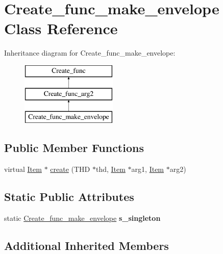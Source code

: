 \hypertarget{classCreate__func__make__envelope}{}\section{Create\+\_\+func\+\_\+make\+\_\+envelope Class Reference}
\label{classCreate__func__make__envelope}
Inheritance diagram for Create\+\_\+func\+\_\+make\+\_\+envelope\+:\begin{figure}[H]
\begin{center}
\leavevmode
\includegraphics[height=3.000000cm]{classCreate__func__make__envelope}
\end{center}
\end{figure}
\subsection*{Public Member Functions}
\begin{DoxyCompactItemize}
\item 
virtual \mbox{\hyperlink{classItem}{Item}} $\ast$ \mbox{\hyperlink{classCreate__func__make__envelope_a4936fb2e01757c1c96fcfd5d22f11d9a}{create}} (T\+HD $\ast$thd, \mbox{\hyperlink{classItem}{Item}} $\ast$arg1, \mbox{\hyperlink{classItem}{Item}} $\ast$arg2)
\end{DoxyCompactItemize}
\subsection*{Static Public Attributes}
\begin{DoxyCompactItemize}
\item 
\mbox{\label{classCreate__func__make__envelope_abe193555a644b4465a97a4c6076a1cba}} 
static \mbox{\hyperlink{classCreate__func__make__envelope}{Create\+\_\+func\+\_\+make\+\_\+envelope}} {\bfseries s\+\_\+singleton}
\end{DoxyCompactItemize}
\subsection*{Additional Inherited Members}


